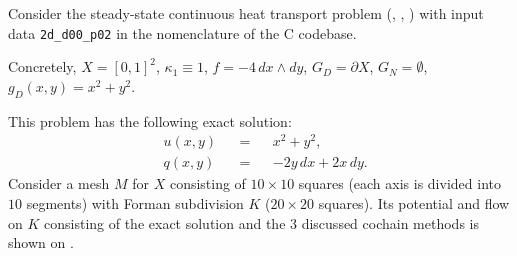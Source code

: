 \begin{example}
  Consider the steady-state continuous heat transport problem 
  (,
   ,
   )
  with input data \verb|2d_d00_p02| in the nomenclature of the C codebase.

  Concretely, $X = [0, 1]^2$, $\kappa_1 \equiv 1$, $f = -4 \, d x \wedge d y$,
  $G_D = \partial X$, $G_N = \emptyset$, $g_D(x, y) = x^2 + y^2$.

  This problem has the following exact solution:
  \begin{subequations}
    \begin{alignat}{3}
      & u(x, y) && = && x^2 + y^2, \\
      & q(x, y) && = && - 2 y\, d x + 2 x\, d y.
    \end{alignat}
  \end{subequations}
  Consider a mesh $M$ for $X$ consisting of $10 \times 10$ squares (each axis is
  divided into $10$ segments) with Forman subdivision $K$ ($20 \times 20$
  squares).
  Its potential and flow on $K$ consisting of the exact solution and the $3$
  discussed cochain methods is shown on
  .
\end{example}
